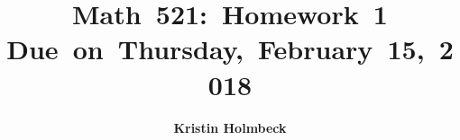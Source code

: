 


\newcommand{\hmwkTitle}{Homework\ 1} %
\newcommand{\hmwkDueDate}{Thursday,\ February\ 15,\ 2018} %
\newcommand{\hmwkClass}{Math\ 521} %
\newcommand{\hmwkAuthorName}{Kristin Holmbeck} %


\title{
\vspace{2in}
\textmd{\textbf{\hmwkClass:\ \hmwkTitle}}\\
\normalsize\vspace{0.1in}\small{Due\ on\ \hmwkDueDate}\\
\vspace{0.1in}
\vspace{3in}
}

\author{\textbf{\hmwkAuthorName}}
\date{} %




\maketitle



\newpage
\tableofcontents
\listoffigures
\newpage



